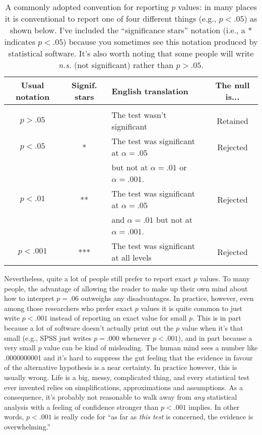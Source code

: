 \vspace{0.5cm}
\begin{table}
\begin{center}
\caption{A commonly adopted convention for reporting $p$ values: in many places it is conventional to report one of four different things (e.g., $p<.05$) as shown below. I've included the ``significance stars'' notation (i.e., a * indicates $p<.05$) because you sometimes see this notation produced by statistical software. It's also worth noting that some people will write {\it n.s.} (not significant) rather than $p>.05$.} \vspace*{12pt}
\label{tab:pvaltable}
\begin{tabular}{c|c|l|c} 
Usual notation & 
Signif. stars & 
English translation & 
The null is... \\[3pt] \hline
&&&\\[-6pt]
$p>.05$ &  & The test wasn't significant &   Retained\\[6pt] %
$p<.05$ & * & The test was significant at $\alpha = .05$  & Rejected \\
        &   & but not at  $\alpha =.01$ or $\alpha = .001$. & \\[6pt] %

$p<.01$ & **  &The test was significant at $\alpha = .05$  & Rejected \\
        &   &and $\alpha = .01$ but not at  $\alpha = .001$. & \\[6pt] %

$p<.001$ & *** & The test was significant at all levels  & Rejected \\ %
 \end{tabular}\tabcapsep
 \HR
 \end{center}
 \end{table} 

Nevertheless, quite a lot of people still prefer to report exact $p$ values. To many people, the advantage of allowing the reader to make up their own mind about how to interpret $p = .06$ outweighs any disadvantages. In practice, however, even among those researchers who prefer exact $p$ values it is quite common to just write $p<.001$ instead of reporting an exact value for small $p$. This is in part because a lot of software doesn't actually print out the $p$ value when it's that small (e.g., SPSS just writes $p = .000$ whenever $p<.001$), and in part because a very small $p$ value can be kind of misleading. The human mind sees a number like .0000000001 and it's hard to suppress the gut feeling that the evidence in favour of the alternative hypothesis is a near certainty. In practice however, this is usually wrong. Life is a big, messy, complicated thing, and every statistical test ever invented relies on simplifications, approximations and assumptions. As a consequence, it's probably not reasonable to walk away from {\it any} statistical analysis with a feeling of confidence stronger than $p<.001$ implies. In other words, $p<.001$ is really code for ``as far as {\it this test} is concerned, the evidence is overwhelming.'' 

